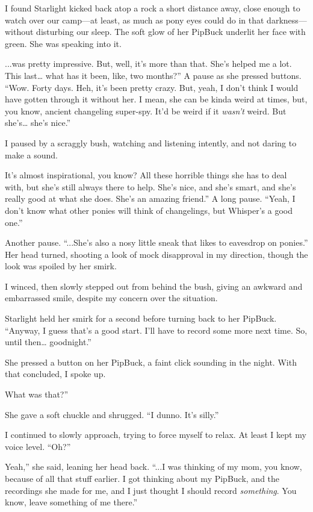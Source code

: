 I found Starlight kicked back atop a rock a short distance away, close enough to watch over our camp—at least, as much as pony eyes could do in that darkness—without disturbing our sleep. The soft glow of her PipBuck underlit her face with green. She was speaking into it.

\leavevmode{}...was pretty impressive. But, well, it’s more than that. She’s helped me a lot. This last… what has it been, like, two months?” A pause as she pressed buttons. “Wow. Forty days. Heh, it’s been pretty crazy. But, yeah, I don’t think I would have gotten through it without her. I mean, she can be kinda weird at times, but, you know, ancient changeling super-spy. It’d be weird if it \textit{wasn’t} weird. But she’s… she’s nice.”

I paused by a scraggly bush, watching and listening intently, and not daring to make a sound.

\leavevmode{}It’s almost inspirational, you know? All these horrible things she has to deal with, but she’s still always there to help. She’s nice, and she’s smart, and she’s really good at what she does. She’s an amazing friend.” A long pause. “Yeah, I don’t know what other ponies will think of changelings, but Whisper’s a good one.”

Another pause. “...She’s also a nosy little sneak that likes to eavesdrop on ponies.” Her head turned, shooting a look of mock disapproval in my direction, though the look was spoiled by her smirk.

I winced, then slowly stepped out from behind the bush, giving an awkward and embarrassed smile, despite my concern over the situation.

Starlight held her smirk for a second before turning back to her PipBuck. “Anyway, I guess that’s a good start. I’ll have to record some more next time. So, until then… goodnight.”

She pressed a button on her PipBuck, a faint click sounding in the night. With that concluded, I spoke up.

\leavevmode{}What was that?”

She gave a soft chuckle and shrugged. “I dunno. It’s silly.”

I continued to slowly approach, trying to force myself to relax. At least I kept my voice level. “Oh?”

\leavevmode{}Yeah,” she said, leaning her head back. “...I was thinking of my mom, you know, because of all that stuff earlier. I got thinking about my PipBuck, and the recordings she made for me, and I just thought I should record \textit{something}. You know, leave something of me there.”

